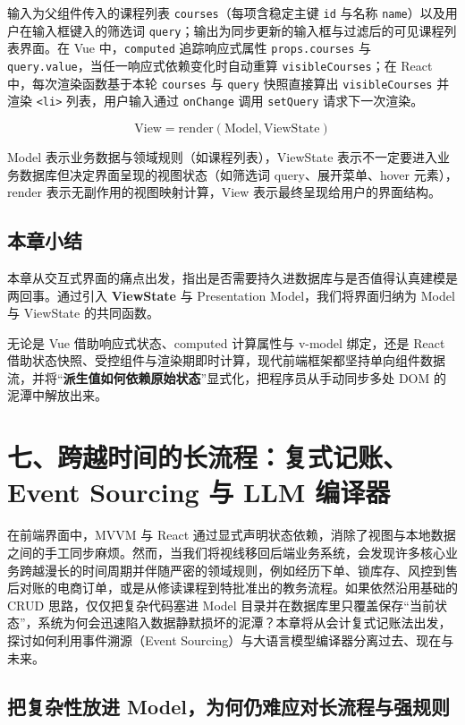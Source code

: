 \documentclass[UTF8,a4paper,11pt,fontset=fandol]{ctexart}
\begin{document}
输入为父组件传入的课程列表 \texttt{courses}（每项含稳定主键 \texttt{id} 与名称 \texttt{name}）以及用户在输入框键入的筛选词 \texttt{query}；输出为同步更新的输入框与过滤后的可见课程列表界面。在 Vue 中，\texttt{computed} 追踪响应式属性 \texttt{props.courses} 与 \texttt{query.value}，当任一响应式依赖变化时自动重算 \texttt{visibleCourses}；在 React 中，每次渲染函数基于本轮 \texttt{courses} 与 \texttt{query} 快照直接算出 \texttt{visibleCourses} 并渲染 \texttt{<li>} 列表，用户输入通过 \texttt{onChange} 调用 \texttt{setQuery} 请求下一次渲染。

\[
\mathrm{View} = \mathrm{render}(\mathrm{Model}, \mathrm{ViewState})
\]

Model 表示业务数据与领域规则（如课程列表），ViewState 表示不一定要进入业务数据库但决定界面呈现的视图状态（如筛选词 query、展开菜单、hover 元素），render 表示无副作用的视图映射计算，View 表示最终呈现给用户的界面结构。

\subsection{本章小结}

本章从交互式界面的痛点出发，指出是否需要持久进数据库与是否值得认真建模是两回事。通过引入 \textbf{ViewState} 与 Presentation Model，我们将界面归纳为 Model 与 ViewState 的共同函数。

无论是 Vue 借助响应式状态、computed 计算属性与 v-model 绑定，还是 React 借助状态快照、受控组件与渲染期即时计算，现代前端框架都坚持单向组件数据流，并将“\textbf{派生值如何依赖原始状态}”显式化，把程序员从手动同步多处 DOM 的泥潭中解放出来。

\section{七、跨越时间的长流程：复式记账、Event Sourcing 与 LLM 编译器}

在前端界面中，MVVM 与 React 通过显式声明状态依赖，消除了视图与本地数据之间的手工同步麻烦。然而，当我们将视线移回后端业务系统，会发现许多核心业务跨越漫长的时间周期并伴随严密的领域规则，例如经历下单、锁库存、风控到售后对账的电商订单，或是从修读课程到特批准出的教务流程。如果依然沿用基础的 CRUD 思路，仅仅把复杂代码塞进 Model 目录并在数据库里只覆盖保存“当前状态”，系统为何会迅速陷入数据静默损坏的泥潭？本章将从会计复式记账法出发，探讨如何利用事件溯源（Event Sourcing）与大语言模型编译器分离过去、现在与未来。

\subsection{把复杂性放进 Model，为何仍难应对长流程与强规则}
\end{document}
